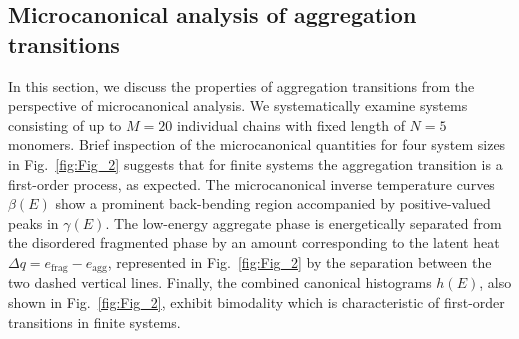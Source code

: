 \documentclass[12pt]{report}
\begin{document}
\subsection{Microcanonical analysis of aggregation transitions}
%
In this section, we discuss the properties of aggregation transitions from
the perspective
of microcanonical analysis. We systematically examine systems consisting
of up to 
$M = 20$ individual chains with fixed length of $N = 5$ monomers. Brief
inspection of 
the microcanonical quantities for four system sizes in Fig.~\ref{fig:Fig_2}
suggests 
that for finite systems the aggregation transition is a first-order
process, as expected. 
The microcanonical inverse temperature curves $\beta(E)$ show a prominent
back-bending 
region accompanied by positive-valued peaks in $\gamma(E)$. The low-energy
aggregate phase is energetically separated from the disordered fragmented 
phase by an amount corresponding to the latent heat 
$\Delta q = e_{\mathrm{frag}} - e_{\mathrm{agg}}$, 
represented in Fig.~\ref{fig:Fig_2} by the separation between the two
dashed vertical lines. Finally, the combined canonical histograms $h(E)$,
also shown in Fig.~\ref{fig:Fig_2}, exhibit bimodality which is
characteristic of first-order transitions in finite systems.
\end{document}
